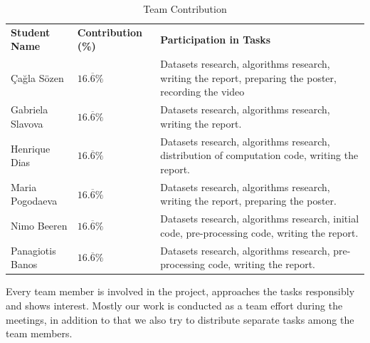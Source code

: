 \documentclass{article}
\begin{document}
    \begin{table}[ht]
    \centering
        \begin{tabular}{|l|l|m{8cm}|}
        \hline
        \textbf{Student Name} & \textbf{Contribution (\%)} & \textbf{Participation in Tasks} \\
        \Xhline{2\arrayrulewidth}
        
        Çağla Sözen & $16.\overline{6}\%$ & Datasets research, algorithms research, writing the report, preparing the poster, recording the video\\
        \hline
        
        Gabriela Slavova & $16.\overline{6}\%$ & Datasets research, algorithms research, writing the report.\\
        \hline
        
        Henrique Dias & $16.\overline{6}\%$ & Datasets research, algorithms research, distribution of computation code, writing the report.\\
        \hline
        
        Maria Pogodaeva & $16.\overline{6}\%$ & Datasets research, algorithms research, writing the report, preparing the poster.\\
        \hline
        
        Nimo Beeren & $16.\overline{6}\%$ & Datasets research, algorithms research, initial code, pre-processing code, writing the report. \\
        \hline
        
        Panagiotis Banos & $16.\overline{6}\%$ & Datasets research, algorithms research, pre-processing code, writing the report. \\
        \hline
        
        \end{tabular}
        \caption{Team Contribution}
        \label{tab:contribution}
    \end{table}
    
    Every team member is involved in the project, approaches the tasks responsibly and shows interest. Mostly our work is conducted as a team effort during the meetings, in addition to that we also try to distribute separate tasks among the team members.
    


% 

\end{document}
